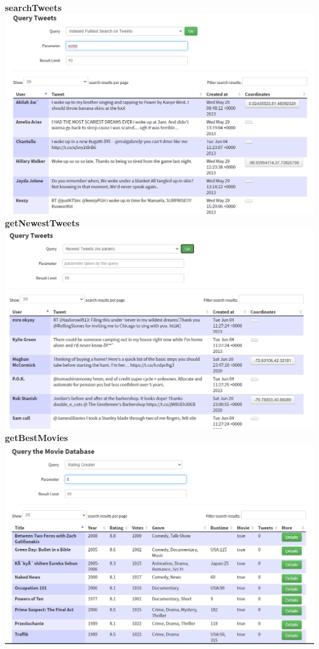 \documentclass[a4paper,english,abstract=on]{scrartcl}
\begin{document}
\textbf{searchTweets}\\
\includegraphics[width=\textwidth,height=\textheight,keepaspectratio]{search_full_text.png}\\
\newpage
\textbf{getNewestTweets}\\
\includegraphics[width=\textwidth,height=\textheight,keepaspectratio]{search_newest_tweets.png}\\
\textbf{getBestMovies}\\
\includegraphics[width=\textwidth,height=\textheight,keepaspectratio]{search_rating.png}\\
\end{document}
